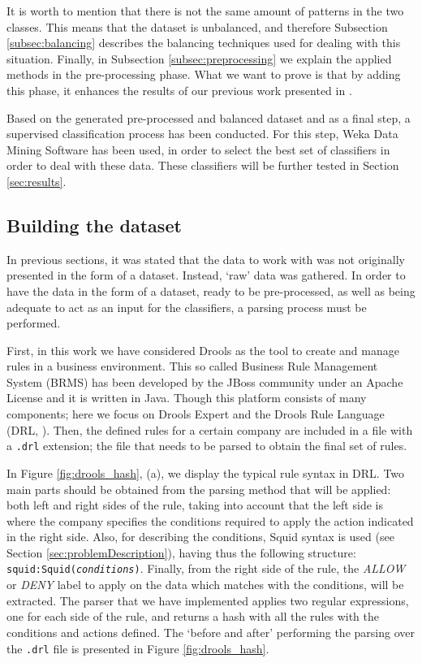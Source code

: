 \documentclass{llncs}
\begin{document}
It is worth to mention that there is not the same amount of patterns in the two classes. This means that the dataset is unbalanced, and therefore Subsection \ref{subsec:balancing} describes the balancing techniques used for dealing with this situation. Finally, in Subsection \ref{subsec:preprocessing} we explain the applied methods in the pre-processing phase. What we want to prove is that by adding this phase, it enhances the results of our previous work presented in \cite{ECTA}.

Based on the generated pre-processed and balanced dataset and as a final step, a supervised classification process \cite{classification_67} has been conducted. For this step, Weka Data Mining Software\cite{weka:site} has been used, in order to select the best set of classifiers in order to deal with these data. These classifiers will be further tested in Section \ref{sec:results}.

%
\subsection{Building the dataset}
\label{sec:buldingdataset}

In previous sections, it was stated that the data to work with was not originally presented in the form of a dataset. Instead, `raw' data was gathered. In order to have the data in the form of a dataset, ready to be pre-processed, as well as being adequate to act as an input for the classifiers, a parsing process must be performed.

First, in this work we have considered Drools \cite{drools:site} as the tool to create and  manage rules in a business environment. This so called Business Rule Management System (BRMS) has been developed by the JBoss community under an Apache License and it is written in Java. Though this platform consists of many components; here we focus on Drools Expert and the Drools Rule Language (DRL, \cite{drools:doc}). Then, the defined rules for a certain company are included in a file with a \texttt{.drl} extension; the file that needs to be parsed to obtain the final set of rules. 

In Figure \ref{fig:drools_hash}, (a), we display the typical rule syntax in DRL. Two main parts should be obtained from the parsing method that will be applied: both left and right sides of the rule, taking into account that the left side is where the company specifies the conditions required to apply the action indicated in the right side. Also, for describing the conditions, Squid syntax is used (see Section \ref{sec:problemDescription}), having thus the following structure: \texttt{squid:Squid(\textit{conditions})}. Finally, from the right side of the rule, the \textit{ALLOW} or \textit{DENY} label to apply on the data which matches with the conditions, will be extracted. 
The parser that we have implemented applies two regular
expressions, one for each side of the rule, and returns a hash with
all the rules with the conditions and actions defined. The `before and
after' performing the parsing over the \texttt{.drl} file is presented
in Figure \ref{fig:drools_hash}. 
\end{document}
